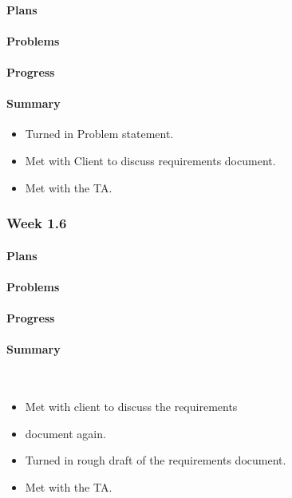 \documentclass[onecolumn, draftclsnofoot,10pt, compsoc]{article}
\begin{document}
		    \paragraph{Plans} \hfill \break

		    \paragraph{Problems} \hfill \break

		    \paragraph{Progress} \hfill \break

		    \paragraph{Summary} \hfill \break
		    	\begin{itemize}
		            \item Turned in Problem statement.
                    \item Met with Client to discuss requirements document.
                    \item Met with the TA.\\
                \end{itemize}


		\subsubsection{Week 1.6}

		    \paragraph{Plans} \hfill \break

		    \paragraph{Problems} \hfill \break

		    \paragraph{Progress} \hfill \break

		    \paragraph{Summary} \hfill \
		        \begin{itemize}
		            \item Met with client to discuss the requirements \item document again.
                    \item Turned in rough draft of the requirements document.
                    \item Met with the TA. \\
                \end{itemize}
\end{document}

